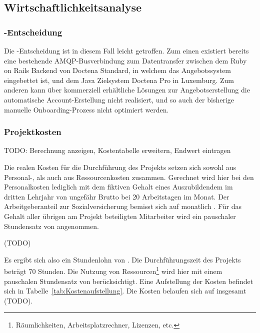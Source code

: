 \subsection{Wirtschaftlichkeitsanalyse}
\label{sec:Wirtschaftlichkeitsanalyse}

\subsubsection{-Entscheidung}
\label{sec:MakeOrBuyEntscheidung}
Die -Entscheidung ist in diesem Fall leicht getroffen. Zum einen existiert bereits eine bestehende \ac{AMQP}-Busverbindung zum Datentransfer zwischen dem Ruby on Rails Backend von Doctena Standard, in welchem das Angebotssystem eingebettet ist, und dem Java Zielsystem Doctena Pro in Luxemburg. Zum anderen kann über kommerziell erhältliche Lösungen zur Angebotserstellung die automatische Account-Erstellung nicht realisiert, und so auch der bisherige manuelle Onboarding-Prozess nicht optimiert werden.

\subsubsection{Projektkosten}
\label{sec:Projektkosten}

TODO: Berechnung anzeigen, Kostentabelle erweitern, Endwert eintragen

Die realen Kosten für die Durchführung des Projekts setzen sich sowohl aus Personal-, als auch aus Ressourcenkosten zusammen. Gerechnet wird hier bei den Personalkosten lediglich mit dem fiktiven Gehalt eines Auszubildendem im dritten Lehrjahr von ungefähr  Brutto bei 20 Arbeitstagen im Monat. Der Arbeitgeberanteil zur Sozialversicherung bemisst sich auf monatlich . Für das Gehalt aller übrigen am Projekt beteiligten Mitarbeiter wird ein pauschaler Stundensatz von  angenommen.

(TODO)

Es ergibt sich also ein Stundenlohn von . Die Durchführungszeit des Projekts beträgt 70 Stunden. Die Nutzung von Ressourcen\footnote{Räumlichkeiten, Arbeitsplatzrechner, Lizenzen, etc.} wird hier mit einem pauschalen Stundensatz von  berücksichtigt. Eine Aufstellung der Kosten befindet sich in Tabelle~\ref{tab:Kostenaufstellung}. Die Kosten belaufen sich auf insgesamt (TODO).

